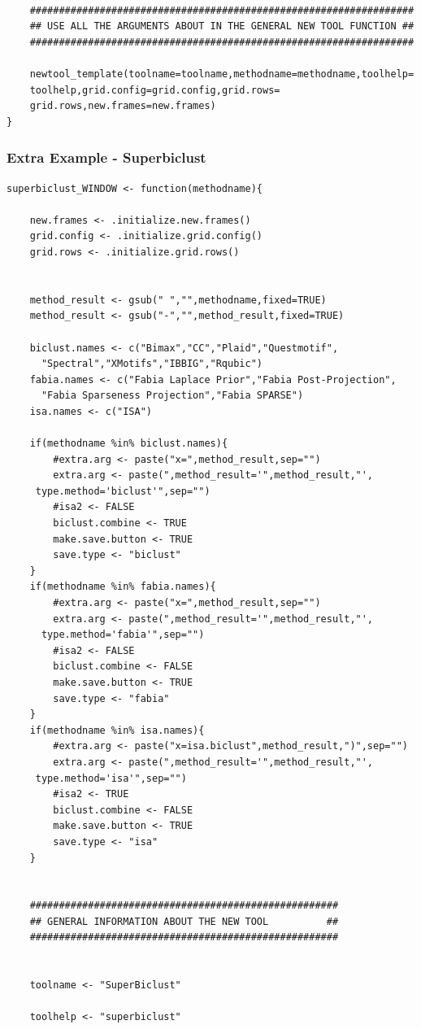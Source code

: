 \documentclass[a4paper]{article}\usepackage[]{graphicx}\usepackage[]{color}
\begin{document}
\begin{verbatim}
	
	##################################################################
	## USE ALL THE ARGUMENTS ABOUT IN THE GENERAL NEW TOOL FUNCTION ##
	##################################################################
	
	newtool_template(toolname=toolname,methodname=methodname,toolhelp=
    toolhelp,grid.config=grid.config,grid.rows=
    grid.rows,new.frames=new.frames)
}
\end{verbatim}
\subsubsection{Extra Example - Superbiclust}
\begin{verbatim}
superbiclust_WINDOW <- function(methodname){  
	
	new.frames <- .initialize.new.frames()
	grid.config <- .initialize.grid.config()
	grid.rows <- .initialize.grid.rows()
	
	
	method_result <- gsub(" ","",methodname,fixed=TRUE)
	method_result <- gsub("-","",method_result,fixed=TRUE)
	
	biclust.names <- c("Bimax","CC","Plaid","Questmotif",
      "Spectral","XMotifs","IBBIG","Rqubic")
	fabia.names <- c("Fabia Laplace Prior","Fabia Post-Projection",
      "Fabia Sparseness Projection","Fabia SPARSE")
	isa.names <- c("ISA")
	
	if(methodname %in% biclust.names){
		#extra.arg <- paste("x=",method_result,sep="")
		extra.arg <- paste(",method_result='",method_result,"',
     type.method='biclust'",sep="")
		#isa2 <- FALSE
		biclust.combine <- TRUE
		make.save.button <- TRUE
		save.type <- "biclust"
	}
	if(methodname %in% fabia.names){
		#extra.arg <- paste("x=",method_result,sep="")
		extra.arg <- paste(",method_result='",method_result,"',
      type.method='fabia'",sep="")
		#isa2 <- FALSE
		biclust.combine <- FALSE
		make.save.button <- TRUE
		save.type <- "fabia"
	}
	if(methodname %in% isa.names){
		#extra.arg <- paste("x=isa.biclust",method_result,")",sep="")
		extra.arg <- paste(",method_result='",method_result,"',
     type.method='isa'",sep="")
		#isa2 <- TRUE
		biclust.combine <- FALSE
		make.save.button <- TRUE
		save.type <- "isa"
	}
	
	
	#####################################################
	## GENERAL INFORMATION ABOUT THE NEW TOOL		   ##
	#####################################################
	
	
	toolname <- "SuperBiclust"
	
	toolhelp <- "superbiclust" 
	

\end{verbatim}
\end{document}

